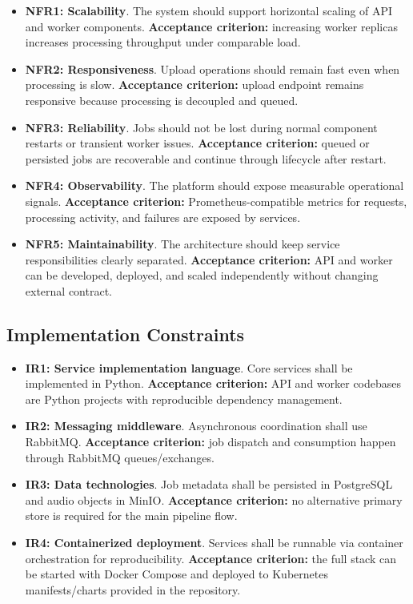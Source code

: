 \documentclass{scrartcl}
\begin{document}
\begin{itemize}
  \item \textbf{NFR1: Scalability}. The system should support horizontal scaling of API and worker components.
  \textbf{Acceptance criterion:} increasing worker replicas increases processing throughput under comparable load.

  \item \textbf{NFR2: Responsiveness}. Upload operations should remain fast even when processing is slow.
  \textbf{Acceptance criterion:} upload endpoint remains responsive because processing is decoupled and queued.

  \item \textbf{NFR3: Reliability}. Jobs should not be lost during normal component restarts or transient worker issues.
  \textbf{Acceptance criterion:} queued or persisted jobs are recoverable and continue through lifecycle after restart.

  \item \textbf{NFR4: Observability}. The platform should expose measurable operational signals.
  \textbf{Acceptance criterion:} Prometheus-compatible metrics for requests, processing activity, and failures are exposed by services.

  \item \textbf{NFR5: Maintainability}. The architecture should keep service responsibilities clearly separated.
  \textbf{Acceptance criterion:} API and worker can be developed, deployed, and scaled independently without changing external contract.
\end{itemize}

\subsection*{Implementation Constraints}

\begin{itemize}
  \item \textbf{IR1: Service implementation language}. Core services shall be implemented in Python.
  \textbf{Acceptance criterion:} API and worker codebases are Python projects with reproducible dependency management.

  \item \textbf{IR2: Messaging middleware}. Asynchronous coordination shall use RabbitMQ.
  \textbf{Acceptance criterion:} job dispatch and consumption happen through RabbitMQ queues/exchanges.

  \item \textbf{IR3: Data technologies}. Job metadata shall be persisted in PostgreSQL and audio objects in MinIO.
  \textbf{Acceptance criterion:} no alternative primary store is required for the main pipeline flow.

  \item \textbf{IR4: Containerized deployment}. Services shall be runnable via container orchestration for reproducibility.
  \textbf{Acceptance criterion:} the full stack can be started with Docker Compose and deployed to Kubernetes manifests/charts provided in the repository.
\end{itemize}
\end{document}
